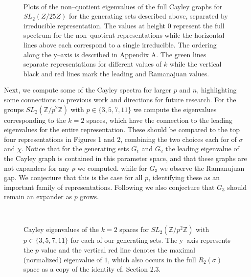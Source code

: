 \documentclass[12pt,reqno]{amsart}
\theoremstyle{remark}
\numberwithin{table}{section}
\newcommand{\Z}{\mathbb Z}
\begin{document}
 \vfill
\begin{figure}[!h]
 \\
\caption{Plots of the non--quotient eigenvalues of the full Cayley graphs for $SL_2(Z/25Z)$ for the generating sets described above, separated by irreducible representation. The values at height $0$ represent the full spectrum for the non--quotient representations while the horizontal lines above each correspond to a single irreducible. The ordering along the y--axis is described in Appendix A. The green lines separate representations for different values of $k$ while the vertical black and red lines mark the leading and Ramanajuan values. }
\end{figure}

\vfill


Next, we compute some of the Cayley spectra for larger $p$ and $n$, highlighting some connections to previous work and directions for future research. For the groups $SL_2(\Z /p^2 \Z)$ with $p\in\{3,5,7,11\}$ we compute the eigenvalues corresponding to the $k=2$ spaces, which have the connection to the leading eigenvalues for the entire representation. These should be compared to the top four representations in Figures 1 and 2, combining the two choices each for of $\sigma$ and $\chi$. Notice that for the generating sets $G_1$ and $G_2$ the leading eigenvalue of the Cayley graph is contained in this parameter space, and that these graphs are not expanders for any $p$ we computed.  while for $G_3$ we observe the Ramanujuan gap. We conjecture that this is the case for all $p$, identifying these as an important family of representations. Following \cite{RS} we also conjecture that $G_3$ should remain an expander as $p$ grows. 

\begin{figure}[!h]
\\

\caption{Cayley eigenvalues of the $k=2$ spaces for  $SL_2(\Z /p^2 \Z)$ with $p\in\{3,5,7,11\}$ for each of our generating sets. The y--axis represents the $p$ value and the vertical red line denotes the maximal (normalized) eigenvalue of $1$, which also occurs in the full $R_2(\sigma)$ space as a copy of the identity cf. Section 2.3.  }
\end{figure}
\end{document}
